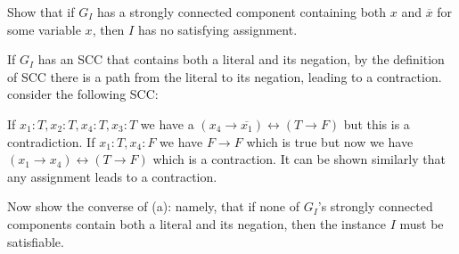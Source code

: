 \documentclass[11pt]{article}
\begin{document}
\begin{subparts}
\newpage
\item Show that if $G_I$ has a strongly connected component containing both $x$ and $\overline x$ for some
variable $x$, then $I$ has no satisfying assignment.\\
\begin{solution}
    If $G_I$ has an SCC that contains both a literal and its negation, by the definition of SCC there is a path from 
    the literal to its negation, leading to a contraction.
    consider the following SCC:
    \begin{center}
    \end{center}
    If $x_1: T, x_2: T, x_4: T, x_3: T$ we have a $(x_4 \rightarrow \overline{x_1}) \leftrightarrow (T \rightarrow F)$ but this is a contradiction. 
    If $x_1: T, x_4: F$ we have  $F \rightarrow F$ which is true but now we have $(x_1 \rightarrow x_4) \leftrightarrow (T \rightarrow F)$ which is a contraction. 
    It can be shown similarly that any assignment leads to a contraction.
\end{solution}
\item Now show the converse of (a): namely, that if none of $G_I$'s strongly connected components
contain both a literal and its negation, then the instance $I$ must be satisfiable. 


\end{subparts}
\end{document}
